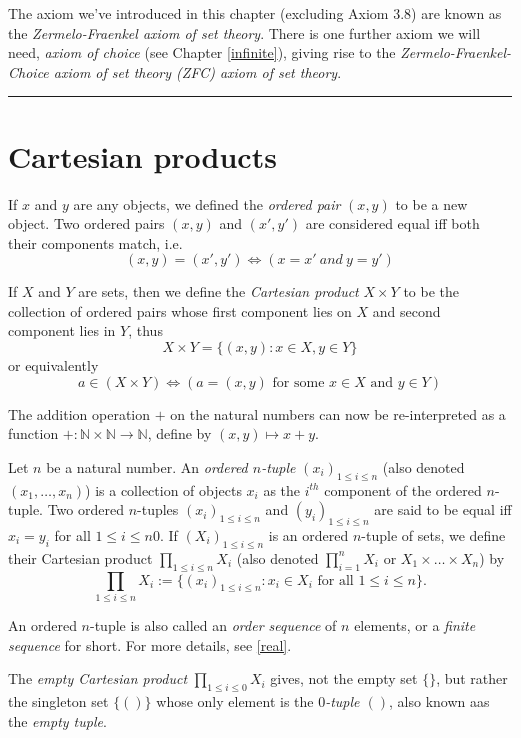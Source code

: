 \documentclass[
]{book}
\theoremstyle{definition}
\theoremstyle{definition}
\theoremstyle{definition}
\theoremstyle{definition}
\theoremstyle{remark}
\begin{document}
The axiom we've introduced in this chapter (excluding Axiom 3.8) are known as the \emph{Zermelo-Fraenkel axiom of set theory}. There is one further axiom we will need, \emph{axiom of choice} (see Chapter \ref{infinite}), giving rise to the \emph{Zermelo-Fraenkel-Choice axiom of set theory (ZFC) axiom of set theory}.

\begin{center}\rule{0.5\linewidth}{0.5pt}\end{center}

\section{Cartesian products}\label{cartesian-products}

If \(x\) and \(y\) are any objects, we defined the \emph{ordered pair} \((x,y)\) to be a new object. Two ordered pairs \((x,y)\) and \((x',y')\) are considered equal iff both their components match, i.e.
\[
(x,y)=(x',y') \iff (x=x'\ and\ y=y')
\]

If \(X\) and \(Y\) are sets, then we define the \emph{Cartesian product} \(X\times Y\) to be the collection of ordered pairs whose first component lies on \(X\) and second component lies in \(Y\), thus
\[
X\times Y = \{(x,y):x\in X, y\in Y\}
\]
or equivalently
\[
a\in(X\times Y) \iff (a=(x,y) \text{ for some }x\in X \text{ and }y \in Y)
\]

The addition operation \(+\) on the natural numbers can now be re-interpreted as a function \(+: \mathbb{N}\times \mathbb{N}\to \mathbb{N}\), define by \((x,y)\mapsto x+y\).

Let \(n\) be a natural number. An \emph{ordered \(n\)-tuple} \((x_i)_{1\leq i\leq n}\) (also denoted \((x_1,\dots,x_n)\)) is a collection of objects \(x_i\) as the \(i^{th}\) component of the ordered \(n\)-tuple. Two ordered \(n\)-tuples \((x_i)_{1\leq i\leq n}\) and \((y_i)_{1\leq i\leq n}\) are said to be equal iff \(x_i=y_i\) for all \(1\leq i\leq n0\). If \((X_i)_{1\leq i\leq n}\) is an ordered \(n\)-tuple of sets, we define their Cartesian product \(\prod_{1\leq i\leq n}X_i\) (also denoted \(\prod_{i=1}^nX_i\) or \(X_1\times \dots\times X_n\)) by
\[
\prod_{1\leq i\leq n}X_i :=\{(x_i)_{1\leq i\leq n}:x_i\in X_i \text{ for all }1\leq i \leq n\}.
\]

An ordered \(n\)-tuple is also called an \emph{order sequence} of \(n\) elements, or a \emph{finite sequence} for short. For more details, see \ref{real}.

The \emph{empty Cartesian product} \(\prod_{1\leq i\leq 0}X_i\) gives, not the empty set \(\{\}\), but rather the singleton set \(\{()\}\) whose only element is the \emph{\(0\)-tuple \(()\)}, also known aas the \emph{empty tuple}.
\end{document}
